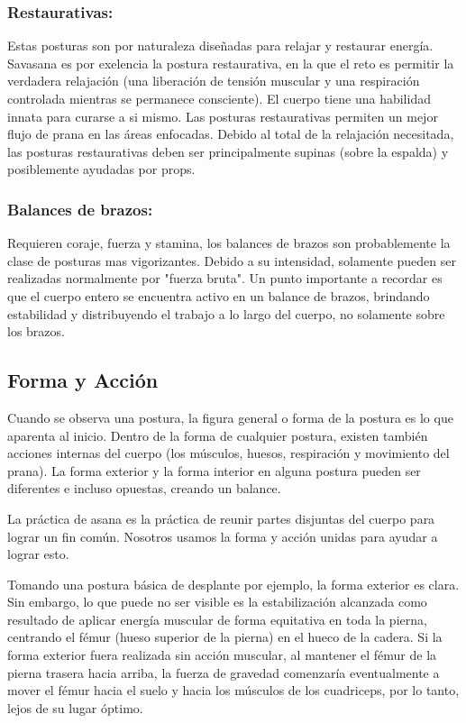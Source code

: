 \subsubsection{Restaurativas:}
Estas posturas son por naturaleza diseñadas para relajar y restaurar energía. Savasana es por exelencia la postura restaurativa, en la que el reto es permitir la verdadera relajación (una liberación de tensión muscular y una respiración controlada mientras se permanece consciente). El cuerpo tiene una habilidad innata para curarse a si mismo. Las posturas restaurativas permiten un mejor flujo de prana en las áreas enfocadas. Debido al total de la relajación necesitada, las posturas restaurativas deben ser principalmente supinas (sobre la espalda) y posiblemente ayudadas por props.

\subsubsection{Balances de brazos:}
Requieren coraje, fuerza y stamina, los balances de brazos son probablemente la clase de posturas mas vigorizantes. Debido a su intensidad, solamente pueden ser realizadas normalmente por "fuerza bruta". Un punto importante a recordar es que el cuerpo entero se encuentra activo en un balance de brazos, brindando estabilidad y distribuyendo el trabajo a lo largo del cuerpo, no solamente sobre los brazos.

\subsection{Forma y Acción}
Cuando se observa una postura, la figura general o forma de la postura es lo que aparenta al inicio. Dentro de la forma de cualquier postura, existen también acciones internas del cuerpo (los músculos, huesos, respiración y movimiento del prana). La forma exterior y la forma interior en alguna postura pueden ser diferentes e incluso opuestas, creando un balance.

La práctica de asana es la práctica de reunir partes disjuntas del cuerpo para lograr un fin común. Nosotros usamos la forma y acción unidas para ayudar a lograr esto.

Tomando una postura básica de desplante por ejemplo, la forma exterior es clara. Sin embargo, lo que puede no ser visible es la estabilización alcanzada como resultado de aplicar energía muscular de forma equitativa en toda la pierna, centrando el fémur (hueso superior de la pierna) en el hueco de la cadera. Si la forma exterior fuera realizada sin acción muscular, al mantener el fémur de la pierna trasera hacia arriba, la fuerza de gravedad comenzaría eventualmente a mover el fémur hacia el suelo y hacia los músculos de los cuadriceps, por lo tanto, lejos de su lugar óptimo.


